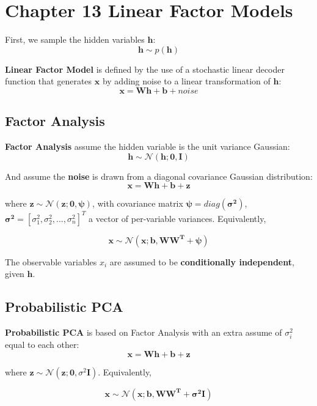 \documentclass[12pt]{article}
\numberwithin{equation}{section}
\begin{document}
\section{Chapter 13 Linear Factor Models}
First, we sample the hidden variables $\bm{h}$:
\begin{equation}
	\bm{h} \sim p(\bm{h})
\end{equation} \par
\textbf{Linear Factor Model} is defined by the use of a stochastic linear decoder function that generates $\bm{x}$ by adding noise to a linear transformation of $\bm{h}$:
\begin{equation}
	\bm{x} = \bm{Wh}+\bm{b}+noise
\end{equation} \par
\subsection{Factor Analysis}
	\textbf{Factor Analysis} assume the hidden variable is the unit variance Gaussian:
	\begin{equation}
		\bm{h} \sim \mathcal{N}(\bm{h;0,I})
	\end{equation} \par
	And assume the \textbf{noise} is drawn from a diagonal covariance Gaussian distribution:
	\begin{equation}
		\bm{x} = \bm{Wh}+\bm{b}+\bm{z}
	\end{equation} \par	
	where $\bm{z} \sim \mathcal{N}(\bm{z;0,\psi})$, with covariance matrix $\bm{\psi} = diag(\bm{\sigma^2})$, $\bm{\sigma^2}=[\sigma_1^2, \sigma_2^2,...,\sigma_n^2]^T$ a vector of per-variable variances. Equivalently, \par
	\begin{equation}
		\bm{x} \sim \mathcal{N}(\bm{x;b,WW^T+\psi})
	\end{equation} \par
	The observable variables $x_i$ are assumed to be \textbf{conditionally independent}, given $\bm{h}$.
\subsection{Probabilistic PCA}
	\textbf{Probabilistic PCA} is based on Factor Analysis with an extra assume of $\sigma_i^2$ equal to each other:
	\begin{equation}
		\bm{x} = \bm{Wh}+\bm{b}+\bm{z}
	\end{equation} \par
	where $\bm{z} \sim \mathcal{N}(\bm{z;0,}\sigma ^2\bm{I})$. Equivalently, \par
	\begin{equation}
		\bm{x} \sim \mathcal{N}(\bm{x;b,WW^T+\sigma^2 \bm{I}})
	\end{equation} \par
\end{document}

